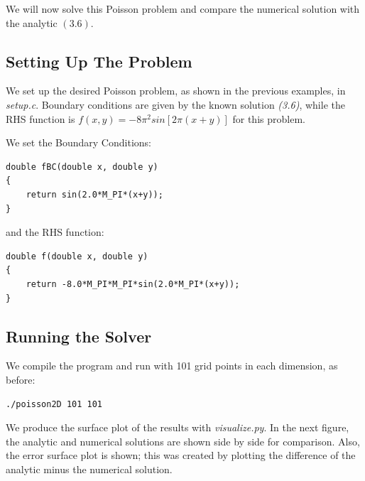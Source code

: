 \documentclass[11pt]{report}
\begin{document}
We will now solve this Poisson problem and compare the numerical solution with the analytic $(3.6)$.

\subsection*{Setting Up The Problem}
We set up the desired Poisson problem, as shown in the previous examples, in \emph{setup.c}. Boundary conditions are given by the known solution \emph{(3.6)}, while the RHS function is $f(x,y) =  -8\pi^2 sin\left[ 2\pi \left( x + y\right) \right]$ for this problem. 
\newline

We set the Boundary Conditions:

\begin{lstlisting}
double fBC(double x, double y) 
{
    return sin(2.0*M_PI*(x+y));
}
\end{lstlisting}

and the RHS function:

\begin{lstlisting}
double f(double x, double y) 
{
    return -8.0*M_PI*M_PI*sin(2.0*M_PI*(x+y));
}
\end{lstlisting}

\subsection*{Running the Solver}
We compile the program and run with 101 grid points in each dimension, as before:
\newline 

\begin{lstlisting}
./poisson2D 101 101
\end{lstlisting}

We produce the surface plot of the results with \emph{visualize.py}. In the next figure, the analytic and numerical solutions are shown side by side for comparison. Also, the error surface plot is shown; this was created by plotting the difference of the analytic minus the numerical solution.
\end{document}

